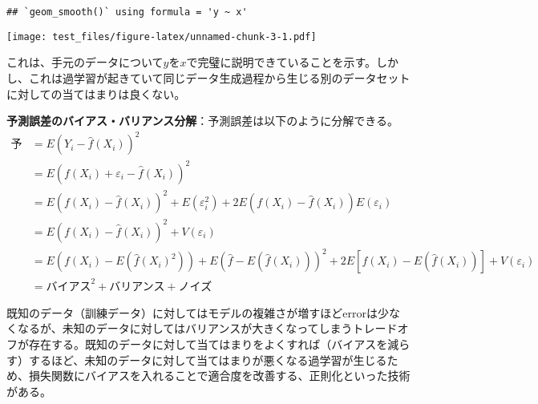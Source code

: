 \documentclass[
  pandoc,
  jafont=haranoaji]{bxjsarticle}
\newenvironment{Shaded}{\begin{snugshade}}{\end{snugshade}}
\newcommand{\AttributeTok}[1]{\textcolor[rgb]{0.13,0.29,0.53}{#1}}
\newcommand{\CommentTok}[1]{\textcolor[rgb]{0.56,0.35,0.01}{\textit{#1}}}
\newcommand{\DecValTok}[1]{\textcolor[rgb]{0.00,0.00,0.81}{#1}}
\newcommand{\FunctionTok}[1]{\textcolor[rgb]{0.13,0.29,0.53}{\textbf{#1}}}
\newcommand{\NormalTok}[1]{#1}
\newcommand{\OtherTok}[1]{\textcolor[rgb]{0.56,0.35,0.01}{#1}}
\newcommand{\SpecialCharTok}[1]{\textcolor[rgb]{0.81,0.36,0.00}{\textbf{#1}}}
\newcommand{\StringTok}[1]{\textcolor[rgb]{0.31,0.60,0.02}{#1}}
\begin{document}
\begin{Shaded}
\end{Shaded}

\begin{verbatim}
## `geom_smooth()` using formula = 'y ~ x'
\end{verbatim}

\texttt{[image: test\_files/figure-latex/unnamed-chunk-3-1.pdf]}

これは、手元のデータについて\(y\)を\(x\)で完璧に説明できていることを示す。しかし、これは過学習が起きていて同じデータ生成過程から生じる別のデータセットに対しての当てはまりは良くない。

\textbf{予測誤差のバイアス・バリアンス分解}：予測誤差は以下のように分解できる。
\[
\begin{align}
\text{予測誤差}　&= E(Y_i-\hat{f}(X_i))^2\\
&= E(f(X_i)+\varepsilon_i -\hat{f}(X_i) )^2\\
&= E(f(X_i)- \hat{f}(X_i))^2 + E(\varepsilon_i^2) + 2E(f(X_i)- \hat{f}(X_i))E(\varepsilon_i)\\
&= E(f(X_i)- \hat{f}(X_i))^2 + V(\varepsilon_i)\\
&= E(f(X_i)-E(\hat{f}(X_i)^2)) + E(\hat{f}-E(\hat{f}(X_i)))^2 + 2E[f(X_i)-E(\hat{f}(X_i))] +V(\varepsilon_i)\\
&= \text{バイアス}^2 + \text{バリアンス} + \text{ノイズ}
\end{align}
\]

既知のデータ（訓練データ）に対してはモデルの複雑さが増すほどerrorは少なくなるが、未知のデータに対してはバリアンスが大きくなってしまうトレードオフが存在する。既知のデータに対して当てはまりをよくすれば（バイアスを減らす）するほど、未知のデータに対して当てはまりが悪くなる過学習が生じるため、損失関数にバイアスを入れることで適合度を改善する、正則化といった技術がある。
\end{document}
